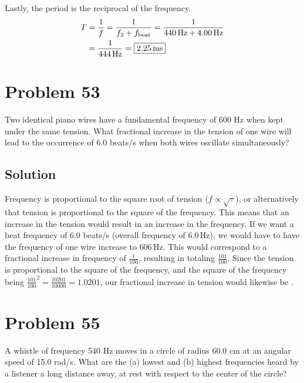 \documentclass[12pt]{article}
\begin{document}
            Lastly, the period is the reciprocal of the frequency.
            \begin{align}
                T   &=  \frac{1}{f}
                    =   \frac{1}{f_2 + f_{\rm beat}}
                    =   \frac{1}{440\,\unit{\hertz} + 4.00\,\unit{\hertz}}\\
                    &=  \frac{1}{444\,\unit{\hertz}}
                    =   \boxed{2.25\,\unit{\milli\second}}
            \end{align}

    \pagebreak
    \section{Problem 53}
        Two identical piano wires have a fundamental frequency of 600 Hz when kept under the same tension. 
        What fractional increase in the tension of one wire will lead to the occurrence of 6.0 beats/s when both wires oscillate simultaneously?

        \subsection{Solution}
            Frequency is proportional to the square root of tension ($f \propto \sqrt{\tau}$), or alternatively that tension is proportional to the square of the frequency.
            This means that an increase in the tension would result in an increase in the frequency.
            If we want a beat frequency of 6.0 beats/s (overall frequency of $6.0\,\unit{\hertz}$), we would have to have the frequency of one wire increase to $606\,\unit{\hertz}$.
            This would correspond to a fractional increase in frequency of $\frac{1}{100}$, resulting in totaling $\frac{101}{100}$.
            Since the tension is proportional to the square of the frequency, and the square of the frequency being $\frac{101}{100}^2 = \frac{10201}{10000} = 1.0201$, our fractional increase in tension would likewise be . 

    \pagebreak
    \section{Problem 55}
        A whistle of frequency 540 Hz moves in a circle of radius 60.0 cm at an angular speed of 15.0 rad/s. 
        What are the (a) lowest and (b) highest frequencies heard by a listener a long distance away, at rest with respect to the center of the circle?
\end{document}
